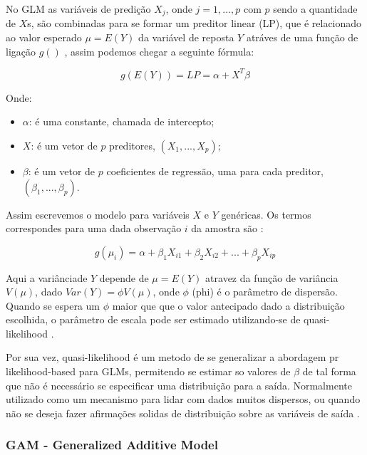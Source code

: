 \documentclass[
	12pt,				%
	openright,			%
	oneside,			%
	a4paper,			%
	english,			%
	brazil				%
	]{abntex2}
\begin{document}
No GLM as variáveis de predição $X_j$, onde $j = 1, ..., p$ com $p$ sendo a quantidade de $X$s, são combinadas para se formar um 
preditor linear (LP), que é relacionado ao valor esperado $\mu = E(Y)$ da variável  de reposta $Y$ atráves de uma função de ligação $g()$ 
\cite{GAMeGLM_especie_estudo}, assim podemos chegar a seguinte fórmula: 

\begin{equation}
	\label{GLM_general_eq}
	g(E(Y)) = LP = \alpha + X^T \beta
\end{equation}

Onde:
\begin{itemize}
	\item $\alpha$: é uma constante, chamada de intercepto;
	\item $X$: é um vetor de $p$ preditores, $(X_1, ..., X_p)$;
	\item $\beta$: é um vetor de $p$ coeficientes de regressão, uma para cada preditor, $(\beta_1, ..., \beta_p)$.
\end{itemize}

Assim escrevemos o modelo para variáveis $X$ e $Y$ genéricas. Os termos correspondes para uma dada observação $i$ da 
amostra são \cite{GAMeGLM_especie_estudo}:

\begin{equation}
	\label{GLM_observ_eq}
	g(\mu_i) = \alpha + \beta_1X_{i1} + \beta_2X_{i2} + ... + \beta_pX_{ip}
\end{equation}

Aqui a variânciade $Y$ depende de $\mu = E(Y)$ atravez da função de variância $V(\mu)$, dado $Var(Y) = \phi V(\mu)$, onde $\phi$ (phi)
é o parâmetro de dispersão. Quando se espera um $\phi$ maior que que o valor antecipado dado a distribuição escolhida, o parâmetro de
escala pode ser estimado utilizando-se de quasi-likelihood \cite{GAMeGLM_especie_estudo}.

Por sua vez, quasi-likelihood é um metodo de se generalizar a abordagem pr likelihood-based para GLMs, permitendo se estimar so valores
de $\beta$ de tal forma que não é necessário se especificar uma distribuição para a saída. Normalmente utilizado como um mecanismo
para lidar com dados muitos dispersos, ou quando não se deseja fazer afirmações solidas de distribuição sobre as variáveis de saída 
\cite{quase-likehood}.

\subsubsection{GAM - Generalized Additive Model}
\end{document}
